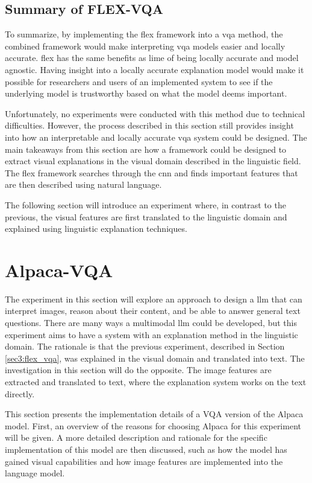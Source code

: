         \subsection{Summary of FLEX-VQA}
        To summarize, by implementing the \gls{flex} framework into a \gls{vqa} method, the combined framework would make interpreting \gls{vqa} models easier and locally accurate. \gls{flex} has the same benefits as \gls{lime} of being locally accurate and model agnostic. Having insight into a locally accurate explanation model would make it possible for researchers and users of an implemented system to see if the underlying model is trustworthy based on what the model deems important. 

        Unfortunately, no experiments were conducted with this method due to technical difficulties. However, the process described in this section still provides insight into how an interpretable and locally accurate \gls{vqa} system could be designed. 
        The main takeaways from this section are how a framework could be designed to extract visual explanations in the visual domain described in the linguistic field. The \gls{flex} framework searches through the \gls{cnn} and finds important features that are then described using natural language. 

        The following section will introduce an experiment where, in contrast to the previous, the visual features are first translated to the linguistic domain and explained using linguistic explanation techniques.

    \section{Alpaca-VQA}
    \label{sec3:alpaca_vqa}

    The experiment in this section will explore an approach to design a \gls{llm} that can interpret images, reason about their content, and be able to answer general text questions. 
    There are many ways a multimodal \gls{llm} could be developed, but this experiment aims to have a system with an explanation method in the linguistic domain. The rationale is that the previous experiment, described in Section \ref{sec3:flex_vqa}, was explained in the visual domain and translated into text. The investigation in this section will do the opposite. The image features are extracted and translated to text, where the explanation system works on the text directly. 

    This section presents the implementation details of a VQA version of the Alpaca model. First, an overview of the reasons for choosing Alpaca for this experiment will be given. A more detailed description and rationale for the specific implementation of this model are then discussed, such as how the model has gained visual capabilities and how image features are implemented into the language model.


